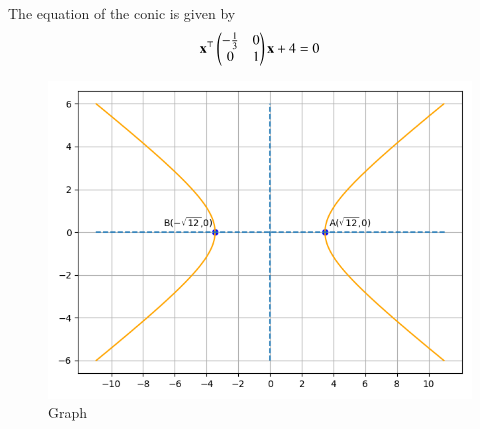 \documentclass[journal,12pt,twocolumn]{IEEEtran}
\begin{document}
\begin{enumerate}
The equation of the conic is given by
\begin{align}
\mathbf{x}^\top\begin{pmatrix}-\frac{1}{3}&0\\0&1\end{pmatrix}\mathbf{x} +4 = 0
\end{align}
\begin{figure}[ht]
\centering
\includegraphics[width = \columnwidth]{"./figs/fig1.png"}
\caption{Graph}
\label{fig:1}
\end{figure}
\begin{table}[h]
\centering

\caption{}
\label{tab:1}
\end{table}
\end{enumerate}
\end{document}
